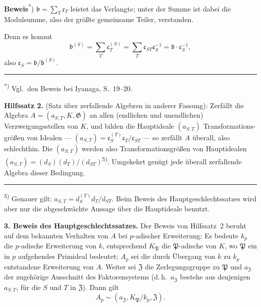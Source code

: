 \documentclass[12pt,a4paper]{article}
\theoremstyle{plain}
\newcommand{\Ga}{\mathfrak{G}}
\begin{document}
\medskip
\noindent\textbf{Beweis}\textsuperscript{*})\hspace{0.5em}%
$\mathfrak{b} = \sum_T \mathfrak{c}_T$ leistet das Verlangte; unter der Summe ist
dabei die Modulsumme, also der gr\"o\ss te gemeinsame Teiler, verstanden.

Denn es kommt
\[
\mathfrak{b}^{(S)} = \sum_T \mathfrak{c}_T^{(S)} = \sum_T \mathfrak{c}_{ST} \mathfrak{c}_S^{-1} = \mathfrak{b} \cdot \mathfrak{c}_S^{-1},
\]
also $\mathfrak{c}_S = \mathfrak{b}/\mathfrak{b}^{(S)}$.

\bigskip
\noindent\rule{0.3\textwidth}{0.4pt}

{\small
\textsuperscript{*)} Vgl.\ den Beweis bei Iyanaga, S.\ 19--20.
}

\medskip
\noindent\textbf{Hilfssatz 2.}\hspace{0.5em}%
(Satz \"uber zerfallende Algebren in anderer Fassung):
Zerf\"allt die Algebra $A = (a_{S,T}, K, \Ga)$ an allen (endlichen und unendlichen)
Verzweigungsstellen von $K$, und bilden die Hauptideale $(a_{S,T})$ Transformations-
gr\"o\ss en von Idealen --- $(a_{S,T}) = \mathfrak{c}_S^{(T)} \mathfrak{c}_T / \mathfrak{c}_{ST}$ --- so zerf\"allt $A$ \"uberall, also
schlechthin. Die $(a_{S,T})$ werden also Transformationsgr\"o\ss en von Hauptidealen
$(a_{S,T}) = (d_S) (d_T) / (d_{ST})$\textsuperscript{5)}. Umgekehrt gen\"ugt jede \"uberall zerfallende Algebra
dieser Bedingung.

\bigskip
\noindent\rule{0.3\textwidth}{0.4pt}

{\small
\textsuperscript{5)} Genauer gilt: $a_{S,T} = d_S^{(T)} d_T / d_{ST}$. Beim Beweis des Hauptgeschlechtssatzes
wird aber nur die abgeschw\"achte Aussage \"uber die Hauptideale benutzt.
}


\medskip
\noindent\textbf{3. Beweis des Hauptgeschlechtssatzes.}\hspace{0.5em}%
Der Beweis von Hilfssatz~2 beruht auf dem bekannten Verhalten von $A$ bei $p$-adischer
Erweiterung: Es bedeute $k_p$ die $p$-adische Erweiterung von $k$, entsprechend
$K_{\mathfrak{P}}$ die $\mathfrak{P}$-adische von $K$, wo $\mathfrak{P}$ ein in $p$ aufgehendes Primideal bedeutet;
$A_p$ sei die durch \"Ubergang von $k$ zu $k_p$ entstandene Erweiterung von $A$.
Weiter sei $\mathfrak{Z}$ die Zerlegungsgruppe zu $\mathfrak{P}$ und $a_{\mathfrak{Z}}$ der zugeh\"orige Ausschnitt
des Faktorensystems (d.\,h.\ $a_{\mathfrak{Z}}$ bestehe aus denjenigen $a_{S,T}$, f\"ur die $S$ und $T$
in $\mathfrak{Z}$). Dann gilt
\[
A_p \sim (a_{\mathfrak{Z}}, K_{\mathfrak{P}}/k_p, \mathfrak{Z}).
\]
\end{document}
